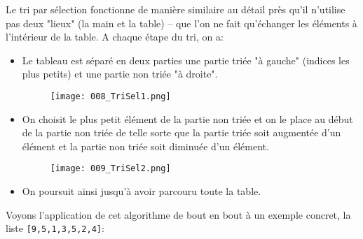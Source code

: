 \documentclass[12pt]{article}
\begin{document}
	Le tri par sélection fonctionne de manière similaire au détail près qu'il n'utilise pas deux "lieux" (la main et la table) -- que l'on ne fait qu'échanger les éléments à l'intérieur de la table. A chaque étape du tri, on a:
	\begin{itemize}
		\item Le tableau est séparé en deux parties une partie triée "à gauche" (indices les plus petits) et une partie non triée "à droite".
		\begin{figure}[H]
			\centering
			\texttt{[image: 008\_TriSel1.png]}
		\end{figure}
		\item On choisit le plus petit élément de la partie non triée et on le place au début de la partie non triée de telle sorte que la partie triée soit augmentée d'un élément et la partie non triée soit diminuée d'un élément.
		\begin{figure}[H]
			\centering
			\texttt{[image: 009\_TriSel2.png]}
		\end{figure}
		\item On poursuit ainsi jusqu'à avoir parcouru toute la table.
	\end{itemize}
	
	Voyons l'application de cet algorithme de bout en bout à un exemple concret, la liste \texttt{[9,5,1,3,5,2,4]}:
	
\end{document}
